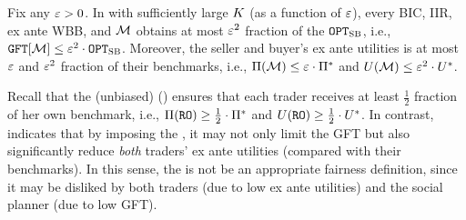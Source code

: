 \begin{lemma}
    \label{lem:equitable GFT UB}
    Fix any $\varepsilon > 0$. In  with sufficiently large $K$ (as a function of $\varepsilon$),
    every BIC, IIR, ex ante WBB, and {\equitable} $\mathcal{M}$ obtains at most $\varepsilon^2$ fraction of the {\SecondBest} $\texttt{OPT}_{\textsc{SB}}$, i.e., $\GFT{\mech} \leq \eps^2 \cdot \OPTSB$. Moreover, the seller and buyer's ex ante utilities is at most $\varepsilon$ and $\varepsilon^2$ fraction of their benchmarks, i.e., $\Pi(\mathcal{M}) \leq \varepsilon \cdot \Pi^*$ and $U(\mathcal{M}) \leq \varepsilon^2 \cdot U^*$.
\end{lemma}
Recall that the (unbiased) {\RandomOffer} ({\RO}) ensures that each trader receives at least $\frac{1}{2}$ fraction of her own benchmark, i.e., $\Pi(\texttt{RO}) \geq \frac{1}{2}\cdot \Pi^*$ and $U(\texttt{RO})\geq \frac{1}{2}\cdot U^*$. In contrast,  indicates that by imposing the {\equitability}, it may not only limit the GFT but also significantly reduce \emph{both} traders' ex ante utilities (compared with their benchmarks). In this sense, the {\equitability} is not be an appropriate fairness definition, since it may be disliked by both traders (due to low ex ante utilities) and the social planner (due to low GFT).

